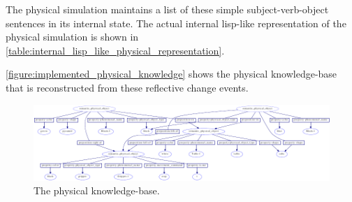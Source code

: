 The physical simulation maintains a list of these simple
subject-verb-object sentences in its internal state.  The actual
internal lisp-like representation of the physical simulation is shown
in \autoref{table:internal_lisp_like_physical_representation}.
\begin{table}
\begin{center}
{}
\end{center}
\caption[Internal representation for physical simulation.]{Internal representation for physical simulation.}
\label{table:internal_lisp_like_physical_representation}
\end{table}
{\mbox{\autoref{figure:implemented_physical_knowledge}}} shows the
physical knowledge-base that is reconstructed from these reflective
change events.
\begin{figure}
\begin{center}
\includegraphics[width=24cm]{gfx/implemented_physical_knowledge}
\end{center}
\hspace{4cm}\parbox{15cm}{\caption[The physical knowledge-base.]{The
    physical
    knowledge-base.}\label{figure:implemented_physical_knowledge}}
\end{figure}

